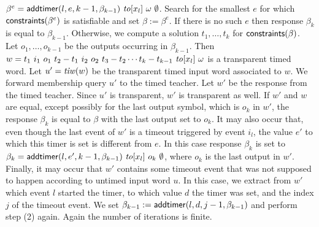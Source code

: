 \begin{enumerate}
$\beta^e = \mathsf{addtimer}({l,e,k-1,\beta_{k-1}}) ~ \mathit{to}[x_l] ~ \omega ~ \emptyset$.
Search for the smallest $e$ for which $\mathsf{constraints}({\beta^e})$ is satisfiable and set $\beta := \beta^e$.
If there is no such $e$ then response $\beta_k$ is equal to $\beta_{k-1}$.
Otherwise, we compute a solution $t_1 ,\ldots, t_k$ for $\mathsf{constraints}({\beta})$.
Let $o_1 ,\ldots, o_{k-1}$ be the outputs occurring in $\beta_{k-1}$. Then
$w = t_1 ~ i_1 ~ o_1 ~ t_2 - t_1 ~ i_2 ~ o_2 ~ t_3- t_2 \cdots t_k - t_{k-1} ~ \mathit{to}[x_l] ~ \omega$ is a transparent timed word.
Let $u' = \mathit{tiw}(w)$ be the transparent timed input word associated to $w$.
We forward membership query $u'$ to the timed teacher.
Let $w'$ be the response from the timed teacher. Since $u'$ is transparent, $w'$ is transparent as well.
If $w'$ and $w$ are equal, except possibly for the last output symbol, which is $o_k$ in $w'$,
the response $\beta_k$ is equal to $\beta$ with the last output set to $o_k$.
It may also occur that, even though the last event of $w'$ is a timeout triggered by event $i_l$, the value $e'$ to which this timer is
set is different from $e$. In this case response $\beta_k$ is set to
$\beta_k = \mathsf{addtimer}({l,e',k-1,\beta_{k-1}}) ~ \mathit{to}[x_l] ~ o_k ~ \emptyset$, where $o_k$ is the last output in $w'$.
Finally, it may occur that $w'$ contains some timeout event that was not supposed to happen according to untimed input word $u$.
In this case, we extract from $w'$ which event $l$ started the timer, to which value
$d$ the timer was set, and the index $j$ of the timeout event.
We set $\beta_{k-1} := \mathsf{addtimer}({l,d,j-1,\beta_{k-1}})$ and perform step (2) again. 
Again the number of iterations is finite.
\end{enumerate}

